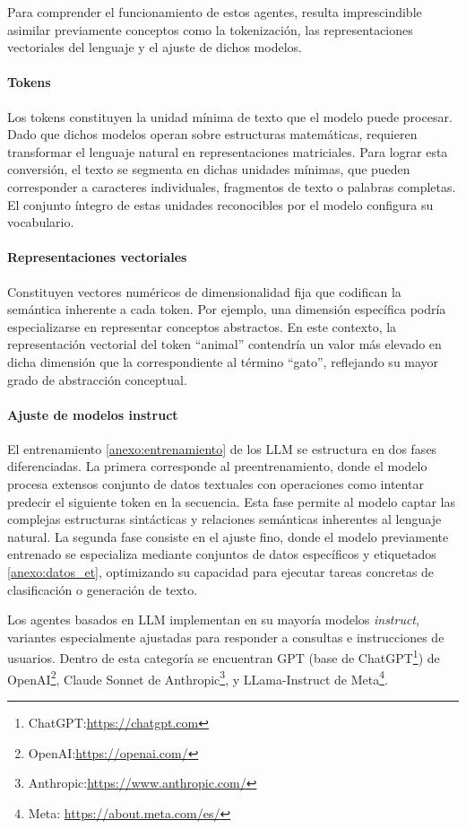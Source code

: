 Para comprender el funcionamiento de estos agentes, resulta imprescindible asimilar previamente conceptos como la tokenización, las representaciones vectoriales del lenguaje y el ajuste de dichos modelos.

\paragraph{Tokens}\label{token}
Los tokens constituyen la unidad mínima de texto que el modelo puede procesar. Dado que dichos modelos operan sobre estructuras matemáticas, requieren transformar el lenguaje natural en representaciones matriciales. Para lograr esta conversión, el texto se segmenta en dichas unidades mínimas, que pueden corresponder a caracteres individuales, fragmentos de texto o palabras completas. El conjunto íntegro de estas unidades reconocibles por el modelo configura su vocabulario. 

\paragraph{Representaciones vectoriales}
Constituyen vectores numéricos de dimensionalidad fija que codifican la semántica inherente a cada token. Por ejemplo, una dimensión específica podría especializarse en representar conceptos abstractos. En este contexto, la representación vectorial del token ``animal'' contendría un valor más elevado en dicha dimensión que la correspondiente al término ``gato'', reflejando su mayor grado de abstracción conceptual.

\paragraph{Ajuste de modelos instruct}
El entrenamiento \ref{anexo:entrenamiento} de los LLM se estructura en dos fases diferenciadas. La primera corresponde al preentrenamiento, donde el modelo procesa extensos conjunto de datos textuales con operaciones como intentar predecir el siguiente token en la secuencia. Esta fase permite al modelo captar las complejas estructuras sintácticas y relaciones semánticas inherentes al lenguaje natural. La segunda fase consiste en el ajuste fino, donde el modelo previamente entrenado se especializa mediante conjuntos de datos específicos y etiquetados \ref{anexo:datos_et}, optimizando su capacidad para ejecutar tareas concretas de clasificación o generación de texto.

Los agentes basados en LLM implementan en su mayoría modelos \textit{instruct}, variantes especialmente ajustadas para responder a consultas e instrucciones de usuarios. Dentro de esta categoría se encuentran GPT (base de ChatGPT\footnote{ChatGPT:\url{https://chatgpt.com}}) de OpenAI\footnote{OpenAI:\url{https://openai.com/}}, Claude Sonnet de Anthropic\footnote{Anthropic:\url{https://www.anthropic.com/}}, y LLama-Instruct de Meta\footnote{Meta: \url{https://about.meta.com/es/}}.



